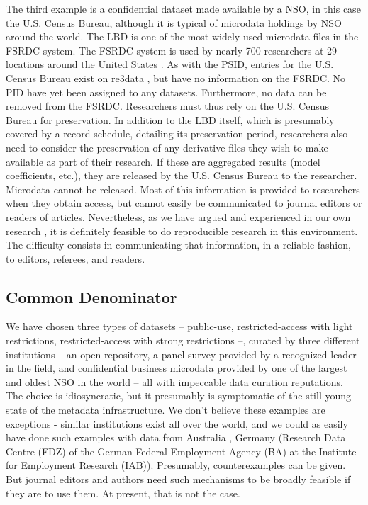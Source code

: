 The third example is a confidential dataset made available by a \ac{NSO}, in this case the U.S. Census Bureau, although it is typical of microdata holdings by \ac{NSO} around the world. The \ac{LBD} \parencite{LBD,MirandaJarmin2002} is one of the most widely used microdata files in the \ac{FSRDC} system. The \ac{FSRDC} system is used by nearly 700 researchers at 29 locations around the United States \parencite{u.s._census_bureau_center_2018}. As with the \ac{PSID}, entries for the U.S. Census Bureau exist on re3data \parencite{Re3data-uscb}, but have no information on the \ac{FSRDC}. No \ac{PID} have yet been assigned to any datasets. Furthermore, no data can be removed from the \ac{FSRDC}. Researchers must thus rely on the U.S. Census Bureau for preservation. In addition to the \ac{LBD} itself, which is presumably covered by a record schedule, detailing its preservation period, researchers also need to consider the preservation of any derivative files they wish to make available as part of their research. If these are aggregated results (model coefficients, etc.), they are released by the U.S. Census Bureau to the researcher. Microdata cannot be released. Most of this information is provided to researchers when they obtain access, but cannot easily be communicated to journal editors or readers of articles. Nevertheless, as we have argued  
\iftoggle{blind}{[BLINDED]}{\parencite{Lagoze2017-qv}} and experienced in our own research 
\iftoggle{blind}{[BLINDED]}{\parencite{AbowdVilhuber2005,AbowdEtAl2009c,McKinneyEtAl:submitted:2017}}, it is definitely feasible to do reproducible research in this environment. The difficulty consists in communicating that information, in a reliable fashion, to editors, referees, and readers.




\subsection{Common Denominator}
We have chosen three types of datasets -- public-use, restricted-access with light restrictions, restricted-access with strong restrictions --, curated by three different institutions -- an open repository, a panel survey  provided by a recognized leader in the field, and confidential business microdata provided by one of the largest and oldest \ac{NSO} in the world -- all with impeccable data curation reputations. The choice is idiosyncratic, but it presumably is symptomatic of the still young state of the metadata infrastructure. We don't believe these examples are exceptions - similar institutions exist all over the world, and we could as easily have done such examples with data from Australia \parencite{PTKLYP_2018}, Germany (Research Data Centre (FDZ) of the German Federal Employment Agency (BA) at the Institute for Employment Research (IAB)). Presumably, counterexamples can be given. But journal editors and authors need such mechanisms to be broadly feasible if they are to use them. At present, that is not the case.

